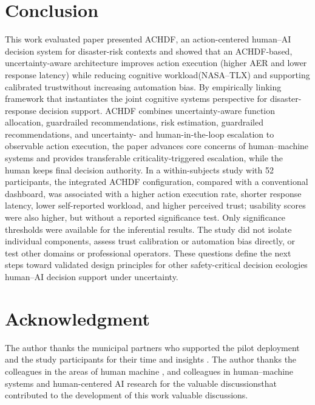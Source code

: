 \documentclass[journal]{IEEEtran}
\theoremstyle{plain}
\theoremstyle{definition}
\providecommand{\DIFaddtex}[1]{{\protect\color{blue} \sf #1}} %
\providecommand{\DIFdeltex}[1]{{\protect\color{red} \scriptsize #1}} %
\providecommand{\DIFaddbegin}{} %
\providecommand{\DIFaddend}{} %
\providecommand{\DIFdelbegin}{} %
\providecommand{\DIFdelend}{} %
\providecommand{\DIFadd}[1]{\texorpdfstring{\DIFaddtex{#1}}{#1}} %
\providecommand{\DIFdel}[1]{\texorpdfstring{\DIFdeltex{#1}}{}} %
\newcommand{\DIFscaledelfig}{0.5}
\newlength{\DIFdelgraphicswidth} %
\newlength{\DIFdelgraphicsheight} %
\newcommand{\DIFaddincludegraphics}[2][]{{\color{blue}\fbox{\DIFOincludegraphics[#1]{#2}}}} %
\newcommand{\DIFdelincludegraphics}[2][]{%
\sbox{\DIFdelgraphicsbox}{\DIFOincludegraphics[#1]{#2}}%
\settoboxwidth{\DIFdelgraphicswidth}{\DIFdelgraphicsbox} %
\settoboxtotalheight{\DIFdelgraphicsheight}{\DIFdelgraphicsbox} %
\scalebox{\DIFscaledelfig}{%
\parbox[b]{\DIFdelgraphicswidth}{\usebox{\DIFdelgraphicsbox}\\[-\baselineskip] \rule{\DIFdelgraphicswidth}{0em}}\llap{\resizebox{\DIFdelgraphicswidth}{\DIFdelgraphicsheight}{%
\setlength{\unitlength}{\DIFdelgraphicswidth}%
\begin{picture}(1,1)%
\thicklines\linethickness{2pt} %
{\color[rgb]{1,0,0}\put(0,0){\framebox(1,1){}}}%
{\color[rgb]{1,0,0}\put(0,0){\line( 1,1){1}}}%
{\color[rgb]{1,0,0}\put(0,1){\line(1,-1){1}}}%
\end{picture}%
}\hspace*{3pt}}} %
} %
\DeclareRobustCommand{\DIFaddbegin}{\DIFOaddbegin \let\includegraphics\DIFaddincludegraphics} %
\DeclareRobustCommand{\DIFaddend}{\DIFOaddend \let\includegraphics\DIFOincludegraphics} %
\DeclareRobustCommand{\DIFdelbegin}{\DIFOdelbegin \let\includegraphics\DIFdelincludegraphics} %
\DeclareRobustCommand{\DIFdelend}{\DIFOaddend \let\includegraphics\DIFOincludegraphics} %
\begin{document}
\section{Conclusion}
This \DIFdelbegin \DIFdel{work evaluated }\DIFdelend \DIFaddbegin \DIFadd{paper presented ACHDF, }\DIFaddend an action-centered human--AI decision \DIFdelbegin \DIFdel{system for disaster-risk contexts and showed that an ACHDF-based, uncertainty-aware architecture improves action execution (higher AER and lower response latency) while reducing cognitive workload(NASA--TLX) and supporting calibrated trustwithout increasing automation bias. By empirically linking }\DIFdelend \DIFaddbegin \DIFadd{framework that instantiates the joint cognitive systems perspective for disaster-response decision support. ACHDF combines }\DIFaddend uncertainty-aware \DIFdelbegin \DIFdel{function allocation, guardrailed recommendations, }\DIFdelend \DIFaddbegin \DIFadd{risk estimation, guardrailed recommendations, and uncertainty- }\DIFaddend and \DIFdelbegin \DIFdel{human-in-the-loop escalation to observable action execution, the paper advances core concerns of human--machine systems and provides transferable }\DIFdelend \DIFaddbegin \DIFadd{criticality-triggered escalation, while the human keeps final decision authority. In a within-subjects study with 52 participants, the integrated ACHDF configuration, compared with a conventional dashboard, was associated with a higher action execution rate, shorter response latency, lower self-reported workload, and higher perceived trust; usability scores were also higher, but without a reported significance test. Only significance thresholds were available for the inferential results. The study did not isolate individual components, assess trust calibration or automation bias directly, or test other domains or professional operators. These questions define the next steps toward validated }\DIFaddend design principles for \DIFdelbegin \DIFdel{other safety-critical decision ecologies}\DIFdelend \DIFaddbegin \DIFadd{human--AI decision support under uncertainty}\DIFaddend .

\section*{Acknowledgment}
The author thanks the \DIFdelbegin \DIFdel{municipal partners who supported the pilot deployment and the }\DIFdelend study participants for their time and insights\DIFdelbegin \DIFdel{. The author thanks the colleagues in the areas of human machine }\DIFdelend \DIFaddbegin \DIFadd{, and colleagues in human--machine }\DIFaddend systems and human-centered AI research for \DIFdelbegin \DIFdel{the valuable discussionsthat contributed to the development of this work}\DIFdelend \DIFaddbegin \DIFadd{valuable discussions}\DIFaddend .


% 
\end{document}
